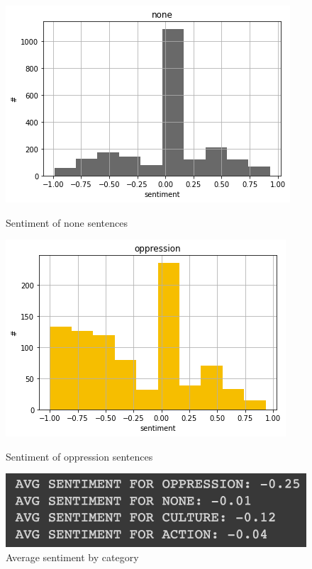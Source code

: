 \documentclass[11pt,letterpaper]{article}
\begin{document}
\begin{figure}[hbt!]
  \centering
  \begin{minipage}[b]{0.45\textwidth}
    \includegraphics[width=\textwidth]{images/senti_none.png}
    \label{fig:senti_none}
    \caption{Sentiment of none sentences}
  \end{minipage}
  \hfill
  \begin{minipage}[b]{0.45\textwidth}
    \includegraphics[width=\textwidth]{images/senti_opp.png}
    \label{fig:senti_opp}
    \caption{Sentiment of oppression sentences}
  \end{minipage}
\end{figure}

\begin{figure}
    \centering
    \includegraphics{images/senti_avg.png}
    \caption{Average sentiment by category}
    \label{fig:senti_avg}
\end{figure}
\end{document}
